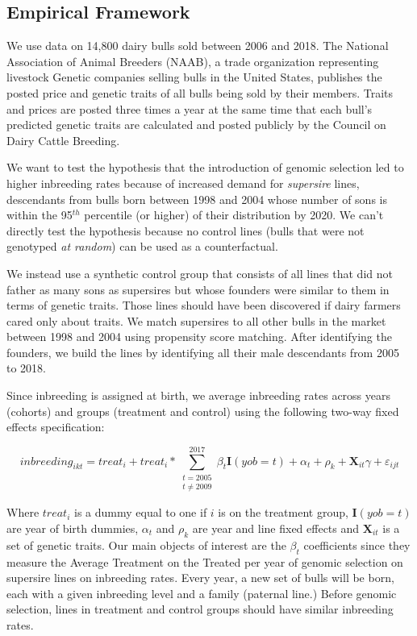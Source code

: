 \documentclass[12pt,letterpaper]{article}
\begin{document}
\subsection*{Empirical Framework}

We use data on 14,800 dairy bulls sold between 2006 and 2018. The National Association
of Animal Breeders (NAAB), a trade organization representing livestock Genetic companies selling bulls in the United States, publishes the posted price and genetic traits of all bulls being sold by their members. Traits and prices are posted three times a year at the same time that each bull’s predicted genetic traits are calculated and posted publicly by the Council on Dairy Cattle Breeding.

We want to test the hypothesis that the introduction of genomic selection led to higher inbreeding rates because of increased demand for \textit{supersire} lines, descendants from bulls born between 1998 and 2004 whose number of sons is within the 95$^{th}$ percentile (or higher) of their distribution by 2020. We can't directly test the hypothesis because no control lines (bulls that were not genotyped \emph{at random}) can be used as a counterfactual.

We instead use a synthetic control group that consists of all lines that did not father as many sons as supersires but whose founders were similar to them in terms of genetic traits. Those lines should have been discovered if dairy farmers cared only about traits. We match supersires to all other bulls in the market between 1998 and 2004 using propensity score matching. After identifying the founders, we build the lines by identifying all their male descendants from 2005 to 2018.

Since inbreeding is assigned at birth, we average inbreeding rates across years (cohorts) and groups (treatment and control) using the following two-way fixed effects specification:

\begin{equation*}
    inbreeding_{ikt} = treat_{i}+treat_{i}*\sum_{\substack{t=2005\\t \neq 2009}}^{2017}\beta_{t}\mathbf{I}(yob=t)+\alpha_{t}+\rho_{k}+\mathbf{X}_{it}\gamma+\varepsilon_{ijt}
\end{equation*}

Where $treat_{i}$ is a dummy equal to one if $i$ is on the treatment group, $\mathbf{I}(yob=t)$ are year of birth dummies, $\alpha_{t}$ and $\rho_{k}$ are year and line fixed effects and $\mathbf{X}_{it}$ is a set of genetic traits. Our main objects of interest are the $\beta_{t}$ coefficients since they measure the Average Treatment on the Treated per year of genomic selection on supersire lines on inbreeding rates. Every year, a new set of bulls will be born, each with a given inbreeding level and a family (paternal line.) Before genomic selection, lines in treatment and control groups should have similar inbreeding rates.
\end{document}
